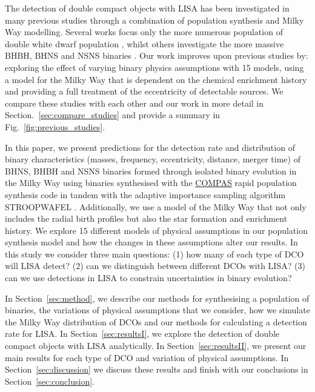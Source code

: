 \documentclass[twocolumn]{aastex63}
\begin{document}
The detection of double compact objects with LISA has been investigated in many previous studies through a combination of population synthesis and Milky Way modelling. Several works focus only the more numerous population of double white dwarf population \citep{Ruiter+2010,Yu+2010,Nissanke+2012,Korol+2017,Lamberts+2018}, whilst others investigate the more massive BHBH, BHNS and NSNS binaries \citep{Nelemans+2001,Liu+2009,Belczynski+2010,Liu+2014,Lamberts+2019,Lau+2020,Breivik+2020,Sesana+2020}. Our work improves upon previous studies by: exploring the effect of varying binary physics assumptions with 15 models, using a model for the Milky Way that is dependent on the chemical enrichment history and providing a full treatment of the eccentricity of detectable sources. We compare these studies with each other and our work in more detail in Section.~\ref{sec:compare_studies} and provide a summary in Fig.~\ref{fig:previous_studies}.

In this paper, we present predictions for the detection rate and distribution of binary characteristics (masses, frequency, eccentricity, distance, merger time) of BHNS, BHBH and NSNS binaries formed through isolated binary evolution in the Milky Way using binaries synthesised with the \href{https://compas.science}{COMPAS} rapid population synthesis code \citep{Stevenson+2017, Vigna-Gomez+2018, Stevenson+2019} in tandem with the adaptive importance sampling algorithm STROOPWAFEL \citep{Broekgaarden+2019}. Additionally, we use a model of the Milky Way that not only includes the radial birth profiles but also the star formation and enrichment history. We explore 15 different models of physical assumptions in our population synthesis model and how the changes in these assumptions alter our results. In this study we consider three main questions: (1) how many of each type of DCO will LISA detect? (2) can we distinguish between different DCOs with LISA? (3) can we use detections in LISA to constrain uncertainties in binary evolution?

In Section~\ref{sec:method}, we describe our methods for synthesising a population of binaries, the variations of physical assumptions that we consider, how we simulate the Milky Way distribution of DCOs and our methods for calculating a detection rate for LISA. In Section~\ref{sec:resultsI}, we explore the detection of double compact objects with LISA analytically. In Section~\ref{sec:resultsII}, we present our main results for each type of DCO and variation of physical assumptions. In Section~\ref{sec:discussion} we discuss these results and finish with our conclusions in Section~\ref{sec:conclusion}.
\end{document}
